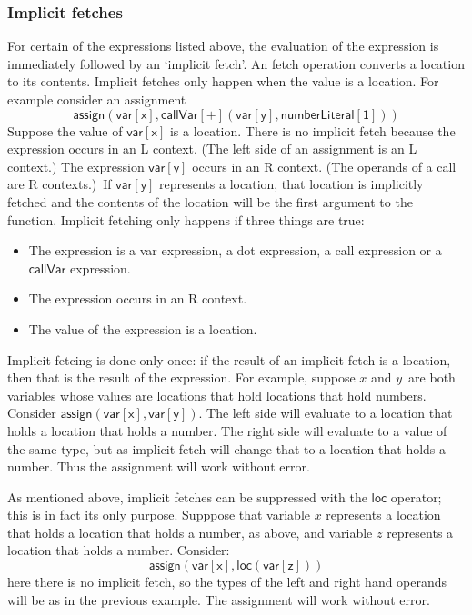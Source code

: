 \documentclass[12pt]{article}
\begin{document}
\subsubsection{Implicit fetches}

For certain of the expressions listed above, the evaluation of the
expression is immediately followed by an `implicit fetch'. An fetch
operation converts a location to its contents. Implicit fetches only happen
when the value is a location. For example consider an assignment 
\begin{equation*}
\mathsf{assign(var[x],callVar[+](var[y],numberLiteral[1]))}
\end{equation*}%
Suppose the value of $\mathsf{var[x]}$ is a location. There is no implicit
fetch because the expression occurs in an L context. (The left side of an
assignment is an L context.) The expression $\mathsf{var[y]}$ occurs in an R
context. (The operands of a call are R contexts.)\ If $\mathsf{var[y]}$
represents a location, that location is implicitly fetched and the contents
of the location will be the first argument to the function. Implicit
fetching only happens if three things are true:

\begin{itemize}
\item The expression is a \textsf{var} expression, a \textsf{dot}
expression, a \textsf{call} expression or a $\mathsf{callVar}$ expression.

\item The expression occurs in an R context.

\item The value of the expression is a location.
\end{itemize}

Implicit fetcing is done only once: if the result of an implicit fetch is a
location, then that is the result of the expression. For example, suppose $x$
and $y$\ are both variables whose values are locations that hold locations
that hold numbers. Consider $\mathsf{assign(var[x],var[y])}$. The left side
will evaluate to a location that holds a location that holds a number. The
right side will evaluate to a value of the same type, but as implicit fetch
will change that to a location that holds a number. Thus the assignment will
work without error.

As mentioned above, implicit fetches can be suppressed with the $\mathsf{loc}
$ operator; this is in fact its only purpose. Supppose that variable $x$
represents a location that holds a location that holds a number, as above,
and variable $z$ represents a location that holds a number. Consider: 
\begin{equation*}
\mathsf{assign(var[x],loc(var[z]))}
\end{equation*}%
here there is no implicit fetch, so the types of the left and right hand
operands will be as in the previous example. The assignment will work
without error.
\end{document}
